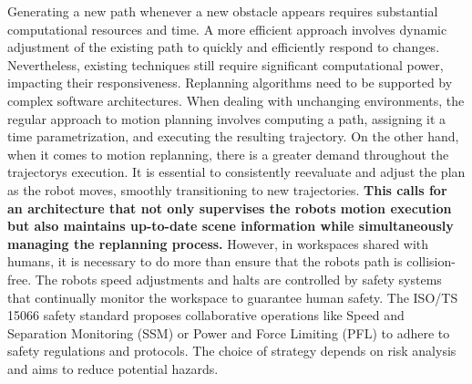 Generating a new path whenever a new obstacle appears requires
substantial computational resources and time. A more efficient approach
involves dynamic adjustment of the existing path to quickly and
efficiently respond to changes. Nevertheless, existing techniques still
require significant computational power, impacting their responsiveness.
Replanning algorithms need to be supported by complex software
architectures. When dealing with unchanging environments, the regular
approach to motion planning involves computing a path, assigning it a
time parametrization, and executing the resulting trajectory. On the
other hand, when it comes to motion replanning, there is a greater
demand throughout the trajectory\textquotesingle s execution. It is
essential to consistently reevaluate and adjust the plan as the robot
moves, smoothly transitioning to new trajectories. \textbf{This calls
for an architecture that not only supervises the robot\textquotesingle s
motion execution but also maintains up-to-date scene information while
simultaneously managing the replanning process.} However, in workspaces
shared with humans, it is necessary to do more than ensure that the
robot\textquotesingle s path is collision-free. The
robot\textquotesingle s speed adjustments and halts are controlled by
safety systems that continually monitor the workspace to guarantee human
safety. The ISO/TS 15066 safety standard proposes collaborative
operations like Speed and Separation Monitoring (SSM) or Power and Force
Limiting (PFL) to adhere to safety regulations and protocols. The choice
of strategy depends on risk analysis and aims to reduce potential
hazards.


